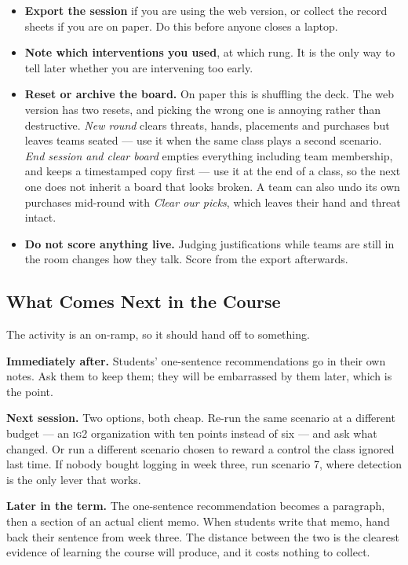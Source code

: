 \documentclass[11pt,letterpaper]{article}
\begin{document}
\begin{itemize}
\item \textbf{Export the session} if you are using the web version, or collect
the record sheets if you are on paper. Do this before anyone closes a laptop.
\item \textbf{Note which interventions you used}, at which rung. It is the only
way to tell later whether you are intervening too early.
\item \textbf{Reset or archive the board.} On paper this is shuffling the deck.
The web version has two resets, and picking the wrong one is annoying rather
than destructive. \emph{New round} clears threats, hands, placements and
purchases but leaves teams seated --- use it when the same class plays a second
scenario. \emph{End session and clear board} empties everything including team
membership, and keeps a timestamped copy first --- use it at the end of a class,
so the next one does not inherit a board that looks broken. A team can also undo
its own purchases mid-round with \emph{Clear our picks}, which leaves their hand
and threat intact.
\item \textbf{Do not score anything live.} Judging justifications while teams are
still in the room changes how they talk. Score from the export afterwards.
\end{itemize}

\subsection{What Comes Next in the Course}

The activity is an on-ramp, so it should hand off to something.

\textbf{Immediately after.} Students' one-sentence recommendations go in their own
notes. Ask them to keep them; they will be embarrassed by them later, which is
the point.

\textbf{Next session.} Two options, both cheap. Re-run the same scenario at a
different budget --- an \textsc{ig2} organization with ten points instead of six
--- and ask what changed. Or run a different scenario chosen to reward a control
the class ignored last time. If nobody bought logging in week three, run scenario
7, where detection is the only lever that works.

\textbf{Later in the term.} The one-sentence recommendation becomes a paragraph,
then a section of an actual client memo. When students write that memo, hand back
their sentence from week three. The distance between the two is the clearest
evidence of learning the course will produce, and it costs nothing to collect.
\end{document}
